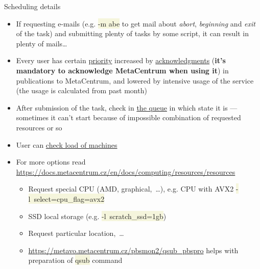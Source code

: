 \documentclass[compress, xelatex, 11pt, xcolor=svgnames, aspectratio=169, url={hyphens, lowtilde}]{beamer}
\renewcommand{\texttt}[1]{\colorbox{Beige}{{\ttfamily #1}}}
\begin{document}
\begin{frame}[allowframebreaks]{Scheduling details}
\begin{itemize}
\begin{itemize}
		\end{itemize}
		\item If requesting e-mails (e.g. \texttt{-m abe} to get mail about \textit{abort}, \textit{beginning} and \textit{exit} of the task) and submitting plenty of tasks by some script, it can result in plenty of mails\ldots
		\item Every user has certain \href{https://metavo.metacentrum.cz/pbsmon2/users/}{priority} increased by \href{https://docs.metacentrum.cz/en/docs/access/terms\#acknowledgements-and-publications}{acknowledgments} (\textbf{it's mandatory to acknowledge MetaCentrum when using it}) in publications to MetaCentrum, and lowered by intensive usage of the service (the usage is calculated from past month)
		\item After submission of the task, check in \href{https://metavo.metacentrum.cz/pbsmon2/queues/jobsQueued}{the queue} in which state it is --- sometimes it can't start because of impossible combination of requested resources or so
		\item User can \href{https://metavo.metacentrum.cz/pbsmon2/nodes/physical}{check load of machines}
		\item For more options read \url{https://docs.metacentrum.cz/en/docs/computing/resources/resources}
		\begin{itemize}
			\item Request special CPU (AMD, graphical,~\ldots), e.g. CPU with AVX2 \texttt{-l~select=cpu\_flag=avx2}
			\item SSD local storage (e.g. \texttt{-l~scratch\_ssd=1gb})
			\item Request particular location,~\ldots
			\item \url{https://metavo.metacentrum.cz/pbsmon2/qsub_pbspro} helps with preparation of \texttt{qsub} command
		\end{itemize}
	\end{itemize}
\end{frame}
\end{document}
